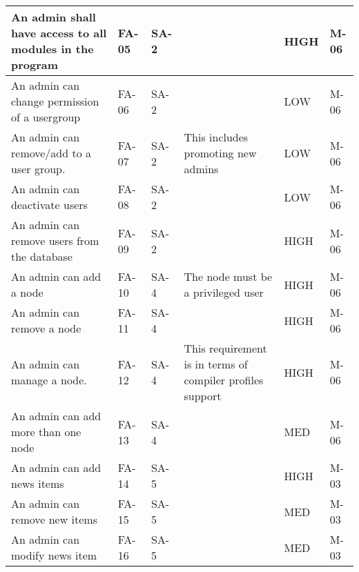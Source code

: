 \begin{longtable}{|p{4cm}|l|l|p{4cm}|l|l|}
An admin shall have access to all modules in the program & FA-05 & SA-2 & &
HIGH & M-06 \\ 
\hline

An admin can change permission of a usergroup & FA-06 & SA-2 & & LOW & M-06 \\
\hline

An admin can remove/add to a user group. & FA-07 & SA-2 & This
includes promoting new admins & LOW & M-06 \\ 
\hline 

An admin can deactivate users & FA-08 & SA-2 & & LOW & M-06 \\ 
\hline

An admin can remove users from the database & FA-09 & SA-2 && HIGH & M-06 \\ 
\hline

An admin can add a node & FA-10 & SA-4 & The node must be a privileged
user & HIGH & M-06 \\ 
\hline 

An admin can remove a node & FA-11 & SA-4 & & HIGH & M-06 \\ 
\hline 

An admin can manage a node. & FA-12 & SA-4 & This requirement is in terms of
compiler profiles support & HIGH & M-06 \\ 
\hline 

An admin can add more than one node & FA-13 & SA-4 & & MED & M-06 \\ 
\hline 

An admin can add news items & FA-14 & SA-5 & & HIGH & M-03 \\ 
\hline

An admin can remove new items & FA-15 & SA-5 & & MED & M-03 \\ 
\hline 

An admin can modify news item & FA-16 & SA-5 & & MED & M-03 \\ 
\hline 
\end{longtable}

